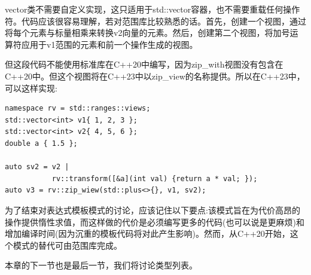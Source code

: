 vector类不需要自定义实现，这只适用于std::vector容器，也不需要重载任何操作符。代码应该很容易理解，若对范围库比较熟悉的话。首先，创建一个视图，通过将每个元素与标量相乘来转换v2向量的元素。然后，创建第二个视图，将加号运算符应用于v1范围的元素和前一个操作生成的视图。

但这段代码不能使用标准库在C++20中编写，因为zip\_with视图没有包含在C++20中。但这个视图将在C++23中以zip\_view的名称提供。所以在C++23中，可以这样实现:

\begin{lstlisting}[style=styleCXX]
namespace rv = std::ranges::views;
std::vector<int> v1{ 1, 2, 3 };
std::vector<int> v2{ 4, 5, 6 };
double a { 1.5 };

auto sv2 = v2 |
           rv::transform([&a](int val) {return a * val; });
auto v3 = rv::zip_wiew(std::plus<>{}, v1, sv2);
\end{lstlisting}

为了结束对表达式模板模式的讨论，应该记住以下要点:该模式旨在为代价高昂的操作提供惰性求值，而这样做的代价是必须编写更多的代码(也可以说是更麻烦)和增加编译时间(因为沉重的模板代码将对此产生影响)。然而，从C++20开始，这个模式的替代可由范围库完成。

本章的下一节也是最后一节，我们将讨论类型列表。













